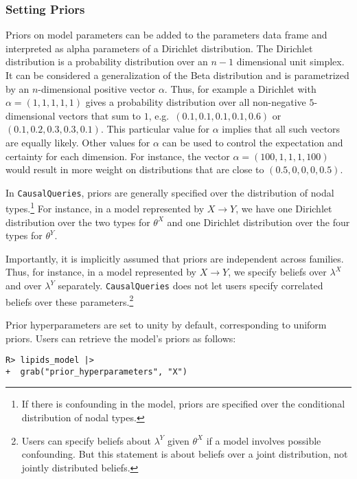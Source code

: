 \documentclass[
  11pt,
  article]{jss}
\begin{document}
\subsubsection{Setting Priors}\label{priors}

Priors on model parameters can be added to the parameters data frame and
interpreted as alpha parameters of a Dirichlet distribution. The
Dirichlet distribution is a probability distribution over an \(n-1\)
dimensional unit simplex. It can be considered a generalization of the
Beta distribution and is parametrized by an \(n\)-dimensional positive
vector \(\alpha\). Thus, for example a Dirichlet with
\(\alpha = (1, 1, 1, 1, 1)\) gives a probability distribution over all
non-negative \(5\)-dimensional vectors that sum to \(1\),
e.g.~\((0.1, 0.1, 0.1, 0.1, 0.6)\) or \((0.1, 0.2, 0.3, 0.3, 0.1)\).
This particular value for \(\alpha\) implies that all such vectors are
equally likely. Other values for \(\alpha\) can be used to control the
expectation and certainty for each dimension. For instance, the vector
\(\alpha = (100, 1, 1, 1, 100)\) would result in more weight on
distributions that are close to \((0.5, 0, 0, 0, 0.5)\).

In \texttt{CausalQueries}, priors are generally specified over the
distribution of nodal types.\footnote{If there is confounding in the
  model, priors are specified over the conditional distribution of nodal
  types.} For instance, in a model represented by \(X \rightarrow Y\),
we have one Dirichlet distribution over the two types for \(\theta^X\)
and one Dirichlet distribution over the four types for \(\theta^Y\).

Importantly, it is implicitly assumed that priors are independent across
families. Thus, for instance, in a model represented by
\(X \rightarrow Y\), we specify beliefs over \(\lambda^X\) and over
\(\lambda^Y\) separately. \texttt{CausalQueries} does not let users
specify correlated beliefs over these parameters.\footnote{Users can
  specify beliefs about \(\lambda^Y\) given \(\theta^X\) if a model
  involves possible confounding. But this statement is about beliefs
  over a joint distribution, not jointly distributed beliefs.}

Prior hyperparameters are set to unity by default, corresponding to
uniform priors. Users can retrieve the model's priors as follows:

\begin{verbatim}
R> lipids_model |> 
+  grab("prior_hyperparameters", "X") 
\end{verbatim}
\end{document}
